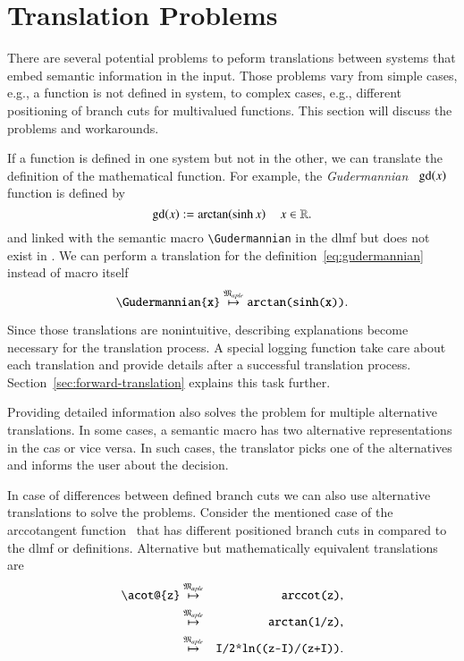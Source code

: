 \section{Translation Problems}\label{sec:problems}
There are several potential problems to peform translations between systems that embed semantic information in the input. Those problems vary from simple cases, e.g., a function is not defined in system, to complex cases, e.g., different positioning of branch cuts for multivalued functions. This section will discuss the problems and workarounds.

If a function is defined in one system but not in the other, we can translate the definition of the mathematical function. For example, the \textit{Gudermannian}~\parencite[eq. 4.23.10]{NIST:DLMF} $\mathrm{gd}\!\left(x\right)$ function is defined by
\begin{equation}\label{eq:gudermannian}
\mathrm{gd}\!\left(x\right) := \mathrm{arctan}\!\left(\sinh{x}\right) \quad x \in \mathbb{R}.
\end{equation}
and linked with the semantic macro \verb|\Gudermannian| in the \gls*{dlmf} but does not exist in \Maple. We can perform a translation for the definition~\ref{eq:gudermannian} instead of macro itself
\begin{equation}\label{eq:guder-trans}
\verb|\Gudermannian{x}| \overset{\langMaple}{\mapsto} \texttt{arctan(sinh(x))}.
\end{equation}

Since those translations are nonintuitive, describing explanations become necessary for the translation process. A special logging function take care about each translation and provide details after a successful translation process. Section~\ref{sec:forward-translation} explains this task further.

Providing detailed information also solves the problem for multiple alternative translations. In some cases, a semantic macro has two alternative representations in the \gls*{cas} or vice versa. In such cases, the translator picks one of the alternatives and informs the user about the decision.

In case of differences between defined branch cuts we can also use alternative translations to solve the problems. Consider the mentioned case of the arccotangent function~\parencite{Branches:acot} that has different positioned branch cuts in \Maple{} compared to the \gls*{dlmf} or \Mathematica{} definitions. Alternative but mathematically equivalent translations are
\begin{eqnarray}
\verb|\acot@{z}| & \overset{\langMaple}{\mapsto} & \verb|arccot(z)|,\label{eq:acot-alternatives}\\
& \overset{\langMaple}{\mapsto} & \verb|arctan(1/z)|,\label{eq:acot-alternatives-1}\\
& \overset{\langMaple}{\mapsto} & \verb|I/2*ln((z-I)/(z+I))|.\label{eq:acot-alternatives-2}
\end{eqnarray}

